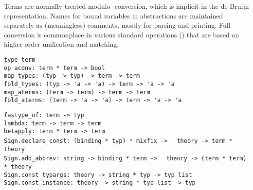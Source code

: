 \begin{isabellebody}
\begin{isamarkuptext}
  Terms are normally treated modulo \isa{{\isasymalpha}}-conversion, which is
  implicit in the de-Bruijn representation.  Names for bound variables
  in abstractions are maintained separately as (meaningless) comments,
  mostly for parsing and printing.  Full \isa{{\isasymalpha}{\isasymbeta}{\isasymeta}}-conversion is
  commonplace in various standard operations ()
  that are based on higher-order unification and matching.%
\end{isamarkuptext}%
\isamarkuptrue%
%
\isadelimmlref
%
\endisadelimmlref
%
\isatagmlref
%
\begin{isamarkuptext}%
\begin{mldecls}
  \verb|type term| \\
  \verb|op aconv: term * term -> bool| \\
  \verb|map_types: (typ -> typ) -> term -> term| \\
  \verb|fold_types: (typ -> 'a -> 'a) -> term -> 'a -> 'a| \\
  \verb|map_aterms: (term -> term) -> term -> term| \\
  \verb|fold_aterms: (term -> 'a -> 'a) -> term -> 'a -> 'a| \\
  \end{mldecls}
  \begin{mldecls}
  \verb|fastype_of: term -> typ| \\
  \verb|lambda: term -> term -> term| \\
  \verb|betapply: term * term -> term| \\
  \verb|Sign.declare_const: (binding * typ) * mixfix ->|\isasep\isanewline%
\verb|  theory -> term * theory| \\
  \verb|Sign.add_abbrev: string -> binding * term ->|\isasep\isanewline%
\verb|  theory -> (term * term) * theory| \\
  \verb|Sign.const_typargs: theory -> string * typ -> typ list| \\
  \verb|Sign.const_instance: theory -> string * typ list -> typ| \\
  \end{mldecls}

  \begin{description}


\end{description}
\end{isamarkuptext}
\end{isabellebody}
